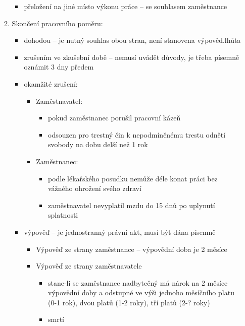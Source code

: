 \documentclass[11pt,a4paper,twoside]{book}
\begin{document}
\begin{enumerate}
\begin{enumerate}
\begin{itemize}
						\item přeložení na jiné místo výkonu práce -- se souhlasem zaměstnance
					\end{itemize}
				\item Skončení pracovního poměru:
					\begin{itemize}
						\item dohodou -- je nutný souhlas obou stran, není stanovena výpověd.lhůta
						\item zrušením ve zkušební době -- nemusí uvádět důvody, je třeba písemně oznámit 3 dny předem
						\item okamžité zrušení:
							\begin{itemize}
								\item Zaměstnavatel:
									\begin{itemize}
										\item pokud zaměstnanec porušil pracovní kázeň
										\item odsouzen pro trestný čin k nepodmíněnému trestu odnětí svobody na dobu delší než 1 rok
									\end{itemize}
								\item Zaměstnanec:
									\begin{itemize}
										\item podle lékařského posudku nemůže déle konat práci bez vážného ohrožení svého zdraví
										\item zaměstnavatel nevyplatil mzdu do 15 dnů po uplynutí splatnosti
									\end{itemize}
							\end{itemize}
						\item výpověď -- je jednostranný právní akt, musí být dána písemně
							\begin{itemize}
								\item Výpověď ze strany zaměstnance -- výpovědní doba je 2 měsíce
								\item Výpověď ze strany zaměstnavatele
									\begin{itemize}
										\item stane-li se zaměstnanec nadbytečný má nárok na 2 měsíce výpovědní doby a odstupné ve výši jednoho měsíčního platu (0-1 rok), dvou platů (1-2 roky), tří platů (2-? roky)
										\item smrtí
									\end{itemize}
							\end{itemize}
					\end{itemize}
			\end{enumerate}
	\end{enumerate}
\end{document}
